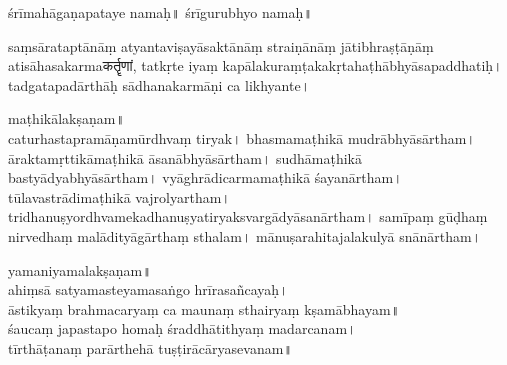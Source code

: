 \begin{sans}
\titleinline{\color{deepmaroon}{\bfseries Kuraṇṭakapaddhatiḥ}}

\centerline{{\large śrīmahāgaṇapataye namaḥ\!॥ śrīgurubhyo namaḥ\!॥}}
\smallskip

saṃsārataptānāṃ\endnote{saṃsāra°] P, saṃsārāsāra° M} %
atyantaviṣayāsaktānāṃ straiṇānāṃ jāti\-bhraṣṭāṇāṃ atisāhasakarmaकर्तॄणां,  tatkṛte iyaṃ kapālakuraṃṭakakṛtahaṭhābhyāsapaddhatiḥ\!।\endnote{°paddhatiḥ] \textit{emend.}, °paddhaty° M} tadgata\-padā\-rthāḥ\endnote{tadgata°] \textit{emend.}, aṃtargata° M} sādhanakarmāṇi\endnote{°karmāṇi] P, °karmāṇī M} ca  likhyante\!।

maṭhikālakṣaṇam\!॥\\ %
caturhastapramāṇamūrdhvaṃ\endnote{ūrdhvaṃ] P, ūrdhva° M} tiryak\!। bhasmamaṭhikā mudrābhyāsārtham\!। āraktamṛttikāmaṭhikā āsanābhyā\-sārtham\!। sudhāmaṭhikā bastyādyabhyāsārtham\endnote{bastyādya°] \textit{conj.}, bastyārthā° M}\!। vyāghrādicarmamaṭhikā śayanārtham\!। tūlavastrādimaṭhikā vajrolyartham\!। tridhanuṣyordhvamekadhanu\-ṣya\-tirya\-ksvargādyāsanārtham\!। samīpaṃ\endnote{samīpaṃ] P, samīpa M} gūḍhaṃ nirvedhaṃ malādityāgārthaṃ sthalam\!। mānuṣarahitajalakulyā snānārtham\!।

yamaniyamalakṣaṇam\!॥\\ %
ahiṃsā satyamasteyamasaṅgo hrīrasañcayaḥ\!।\\
āstikyaṃ brahmacaryaṃ ca maunaṃ\endnote{maunaṃ] P, maunyaṃ M} sthairyaṃ kṣamābhayam\!॥\\
śaucaṃ japastapo homaḥ śraddhātithyaṃ madarcanam\!।\\ %
tīrthāṭanaṃ parārthehā tuṣṭirācāryasevanam\!॥
\end{sans}
\vskip 0.6cm

